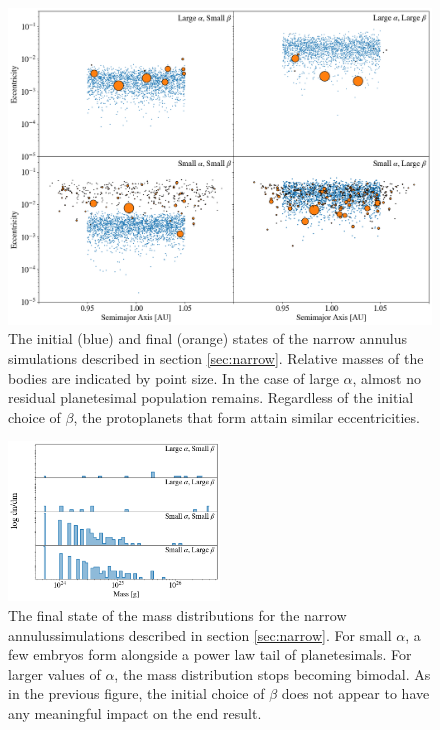 \documentclass[twocolumn]{aastex63}
\begin{document}
\begin{figure}
\begin{center}
    \includegraphics[width=\textwidth]{figures/alpha_beta.png}
    \caption{The initial (blue) and final (orange) states of the narrow annulus simulations described in section \ref{sec:narrow}. 
    Relative masses of the bodies are indicated by point size. In the case of large $\alpha$, almost no residual planetesimal 
    population remains. Regardless of the initial choice of $\beta$, the protoplanets that form attain similar eccentricities. 
    \label{fig:alpha_beta}}
\end{center}
\end{figure}

\begin{figure}
\begin{center}
    \includegraphics[width=0.5\textwidth]{figures/alpha_beta_mass.png}
    \caption{The final state of the mass distributions for the
      narrow annulussimulations described in section \ref{sec:narrow}. For small
      $\alpha$, a few embryos form alongside a power law tail of
      planetesimals. For larger values of $\alpha$, the mass distribution stops becoming bimodal. 
      As in the previous figure, the initial choice of $\beta$ does not appear to have any meaningful impact on the end result.
      \label{fig:alpha_beta_mass}}
\end{center}
\end{figure}
\end{document}
